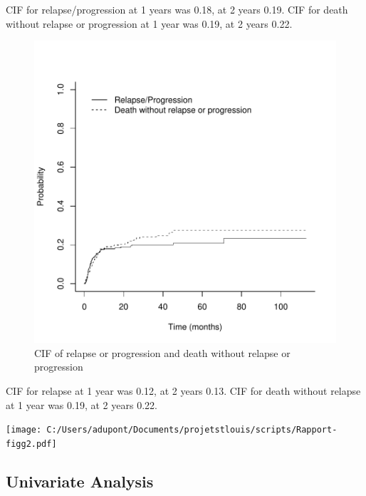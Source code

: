 \documentclass[a4paper,11pt] {article}
\begin{document}
\pagebreak
CIF for relapse/progression at 1 years was 0.18, at 2 years  0.19.
CIF for death without relapse or progression at 1 year was 0.19, at 2 years  0.22. 

\begin{figure}[h]
\begin{center}
\includegraphics{Rapport-fig6}
\end{center}
\caption{CIF of relapse or progression and death without relapse or progression}
\label{fig6}
\end{figure}

\pagebreak
CIF for relapse at 1 year was 0.12, at 2 years  0.13. CIF for death without relapse  at 1 year was 0.19, at 2 years  0.22. 


\begin{center}
\texttt{[image: C:/Users/adupont/Documents/projetstlouis/scripts/Rapport-figg2.pdf]}


\end{center}

\subsection{Univariate Analysis}
\end{document}
